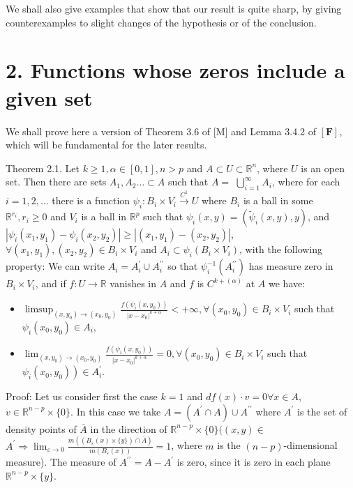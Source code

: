\documentclass[10pt]{article}
\begin{document}
We shall also give examples that show that our result is quite sharp, by giving counterexamples to slight changes of the hypothesis or of the conclusion.

\section*{2. Functions whose zeros include a given set}
We shall prove here a version of Theorem 3.6 of [M] and Lemma 3.4.2 of $[\mathbf{F}]$, which will be fundamental for the later results.

Theorem 2.1. Let $k \geq 1, \alpha \in[0,1], n>p$ and $A \subset U \subset \mathbb{R}^{n}$, where $U$ is an open set. Then there are sets $A_{1}, A_{2} \ldots \subset A$ such that $A=$ $\bigcup_{i=1}^{\infty} A_{i}$, where for each $i=1,2, \ldots$ there is a function $\psi_{i}: B_{i} \times V_{i} \xrightarrow{C^{1}} U$ where $B_{i}$ is a ball in some $\mathbb{R}^{r_{i}}, r_{i} \geq 0$ and $V_{i}$ is a ball in $\mathbb{R}^{p}$ such that $\psi_{i}(x, y)=\left(\widetilde{\psi}_{i}(x, y), y\right)$, and $\left|\psi_{i}\left(x_{1}, y_{1}\right)-\psi_{i}\left(x_{2}, y_{2}\right)\right| \geq\left|\left(x_{1}, y_{1}\right)-\left(x_{2}, y_{2}\right)\right|$, $\forall\left(x_{1}, y_{1}\right),\left(x_{2}, y_{2}\right) \in B_{i} \times V_{i}$ and $A_{i} \subset \psi_{i}\left(B_{i} \times V_{i}\right)$, with the following property: We can write $A_{i}=A_{i}^{\prime} \cup A_{i}^{\prime \prime}$ so that $\psi_{i}^{-1}\left(A_{i}^{\prime \prime}\right)$ has measure zero in $B_{i} \times V_{i}$, and if $f: U \rightarrow \mathbb{R}$ vanishes in $A$ and $f$ is $C^{k+(\alpha)}$ at $A$ we have:

\begin{itemize}
  \item[-] $\limsup _{\left(x, y_{0}\right) \rightarrow\left(x_{0}, y_{0}\right)} \frac{f\left(\psi_{i}\left(x, y_{0}\right)\right)}{\left|x-x_{0}\right|^{k+\alpha}}<+\infty, \forall\left(x_{0}, y_{0}\right) \in B_{i} \times V_{i}$ such that $\psi_{i}\left(x_{0}, y_{0}\right) \in A_{i}$,
  \item[-] $\lim _{\left(x, y_{0}\right) \rightarrow\left(x_{0}, y_{0}\right)} \frac{f\left(\psi_{i}\left(x, y_{0}\right)\right)}{\left|x-x_{0}\right|^{k+\alpha}}=0, \forall\left(x_{0}, y_{0}\right) \in B_{i} \times V_{i}$ such that $\left.\psi_{i}\left(x_{0}, y_{0}\right)\right) \in A_{i}^{\prime}$.
\end{itemize}

Proof: Let us consider first the case $k=1$ and $d f(x) \cdot v=0 \forall x \in A$, $v \in \mathbb{R}^{n-p} \times\{0\}$. In this case we take $A=\left(A^{\prime} \cap A\right) \cup A^{\prime \prime}$ where $A^{\prime}$ is the set of density points of $\bar{A}$ in the direction of $\mathbb{R}^{n-p} \times\{0\}((x, y) \in$ $A^{\prime} \Rightarrow \lim _{\varepsilon \rightarrow 0} \frac{m\left(\left(B_{\varepsilon}(x) \times\{y\}\right) \cap \bar{A}\right)}{m\left(B_{\varepsilon}(x)\right)}=1$, where $m$ is the $(n-p)$-dimensional measure). The measure of $A^{\prime \prime}=A-A^{\prime}$ is zero, since it is zero in each plane $\mathbb{R}^{n-p} \times\{y\}$.
\end{document}
